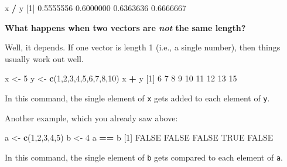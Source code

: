 \documentclass[
]{book}
\newenvironment{Shaded}{\begin{snugshade}}{\end{snugshade}}
\newcommand{\ConstantTok}[1]{\textcolor[rgb]{0.56,0.35,0.01}{#1}}
\newcommand{\DecValTok}[1]{\textcolor[rgb]{0.00,0.00,0.81}{#1}}
\newcommand{\FloatTok}[1]{\textcolor[rgb]{0.00,0.00,0.81}{#1}}
\newcommand{\FunctionTok}[1]{\textcolor[rgb]{0.13,0.29,0.53}{\textbf{#1}}}
\newcommand{\NormalTok}[1]{#1}
\newcommand{\OtherTok}[1]{\textcolor[rgb]{0.56,0.35,0.01}{#1}}
\newcommand{\SpecialCharTok}[1]{\textcolor[rgb]{0.81,0.36,0.00}{\textbf{#1}}}
\begin{document}
\begin{Shaded}
\begin{Highlighting}[]
\NormalTok{x }\SpecialCharTok{/}\NormalTok{ y}
\NormalTok{[}\DecValTok{1}\NormalTok{] }\FloatTok{0.5555556} \FloatTok{0.6000000} \FloatTok{0.6363636} \FloatTok{0.6666667}
\end{Highlighting}
\end{Shaded}

\textbf{What happens when two vectors are \emph{not} the same length?}

Well, it depends. If one vector is length 1 (i.e., a single number), then things usually work out well.

\begin{Shaded}
\begin{Highlighting}[]
\NormalTok{x }\OtherTok{\textless{}{-}} \DecValTok{5}
\NormalTok{y }\OtherTok{\textless{}{-}} \FunctionTok{c}\NormalTok{(}\DecValTok{1}\NormalTok{,}\DecValTok{2}\NormalTok{,}\DecValTok{3}\NormalTok{,}\DecValTok{4}\NormalTok{,}\DecValTok{5}\NormalTok{,}\DecValTok{6}\NormalTok{,}\DecValTok{7}\NormalTok{,}\DecValTok{8}\NormalTok{,}\DecValTok{10}\NormalTok{)}
\NormalTok{x }\SpecialCharTok{+}\NormalTok{ y}
\NormalTok{[}\DecValTok{1}\NormalTok{]  }\DecValTok{6}  \DecValTok{7}  \DecValTok{8}  \DecValTok{9} \DecValTok{10} \DecValTok{11} \DecValTok{12} \DecValTok{13} \DecValTok{15}
\end{Highlighting}
\end{Shaded}

In this command, the single element of \texttt{x} gets added to each element of \texttt{y}.

Another example, which you already saw above:

\begin{Shaded}
\begin{Highlighting}[]
\NormalTok{a }\OtherTok{\textless{}{-}} \FunctionTok{c}\NormalTok{(}\DecValTok{1}\NormalTok{,}\DecValTok{2}\NormalTok{,}\DecValTok{3}\NormalTok{,}\DecValTok{4}\NormalTok{,}\DecValTok{5}\NormalTok{)}
\NormalTok{b }\OtherTok{\textless{}{-}} \DecValTok{4}
\NormalTok{a }\SpecialCharTok{==}\NormalTok{ b}
\NormalTok{[}\DecValTok{1}\NormalTok{] }\ConstantTok{FALSE} \ConstantTok{FALSE} \ConstantTok{FALSE}  \ConstantTok{TRUE} \ConstantTok{FALSE}
\end{Highlighting}
\end{Shaded}

In this command, the single element of \texttt{b} gets compared to each element of \texttt{a}.
\end{document}
